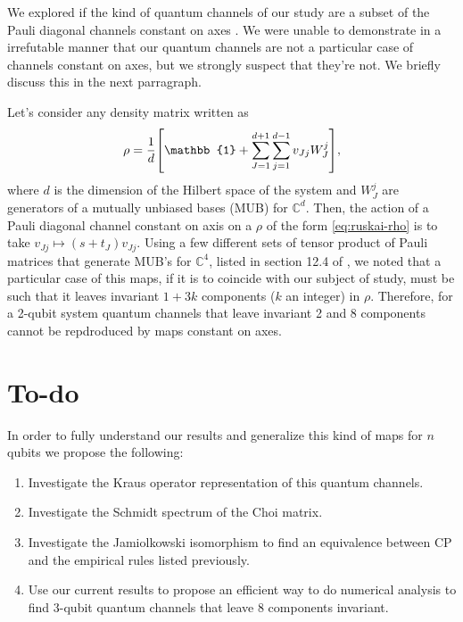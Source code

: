 \documentclass[11pt,dvipsnames]{article} %
\begin{document}
We explored if the kind of quantum channels of our study are a subset 
of the Pauli diagonal channels constant on axes \cite{nathanson2007pauli}.
We were unable to demonstrate in a irrefutable manner that 
our quantum channels are not a particular case of channels constant on axes, 
but we strongly suspect that they're not. We briefly discuss this in the 
next parragraph. 

Let's consider any density matrix written as
\begin{align}
	\rho = \frac{1}{d}\qty[\mathbb{1} + \sum _{J=1}^{d+1} \sum _{j=1}^{d-1}
	v_{Jj}W_J^j],
	\label{eq:ruskai-rho}
\end{align}
where $d$ is the dimension of the Hilbert space of the system and $W_J^j$ 
are generators of a mutually unbiased bases (MUB) for $\mathbb{C}^{d}$. Then,
the action of a Pauli diagonal channel constant on axis on a $\rho$ of the form
\eqref{eq:ruskai-rho} is to take $v_{Jj}\mapsto (s+t_J)v_{Jj}$. Using a few
different sets of tensor product of Pauli matrices that generate MUB's for
$\mathbb{C}^4$, listed in section 12.4 of \cite{bengtsson_zyczkowski_2017}, 
we noted that a particular case of this maps, if it is to coincide with our subject of
study, must be such that it leaves invariant $1+3k$ components ($k$ an integer)
in $\rho$. Therefore, for a 2-qubit system quantum channels that leave 
invariant 2 and 8 components cannot be repdroduced by maps constant on axes. 

\section*{To-do}
In order to fully understand our results and generalize this kind of maps 
for $n$ qubits we propose the following:
\begin{enumerate}
	\item Investigate the Kraus operator representation of this quantum channels.
	\item Investigate the Schmidt spectrum of the Choi matrix.
	\item Investigate the Jamiolkowski isomorphism to find an equivalence
				between CP and the empirical rules listed previously.
	\item Use our current results to propose an efficient way to do numerical
				analysis to find 3-qubit quantum channels that leave 8 components 
				invariant.
\end{enumerate}



\vfill
\end{document}
